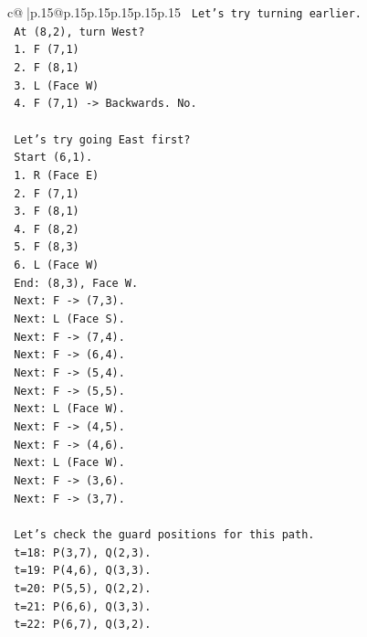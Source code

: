 \documentclass{article}
\begin{document}
{\begin{supertabular}{c@{$\;$}|p{.15\linewidth}@{}p{.15\linewidth}p{.15\linewidth}p{.15\linewidth}p{.15\linewidth}p{.15\linewidth}}
{{{\texttt{       Let's try turning earlier.} \\
\texttt{       At (8,2), turn West?} \\
\texttt{       1. F (7,1)} \\
\texttt{       2. F (8,1)} \\
\texttt{       3. L (Face W)} \\
\texttt{       4. F (7,1) {-}> Backwards. No.} \\
\\ 
\texttt{       Let's try going East first?} \\
\texttt{       Start (6,1).} \\
\texttt{       1. R (Face E)} \\
\texttt{       2. F (7,1)} \\
\texttt{       3. F (8,1)} \\
\texttt{       4. F (8,2)} \\
\texttt{       5. F (8,3)} \\
\texttt{       6. L (Face W)} \\
\texttt{       End: (8,3), Face W.} \\
\texttt{       Next: F {-}> (7,3).} \\
\texttt{       Next: L (Face S).} \\
\texttt{       Next: F {-}> (7,4).} \\
\texttt{       Next: F {-}> (6,4).} \\
\texttt{       Next: F {-}> (5,4).} \\
\texttt{       Next: F {-}> (5,5).} \\
\texttt{       Next: L (Face W).} \\
\texttt{       Next: F {-}> (4,5).} \\
\texttt{       Next: F {-}> (4,6).} \\
\texttt{       Next: L (Face W).} \\
\texttt{       Next: F {-}> (3,6).} \\
\texttt{       Next: F {-}> (3,7).} \\
\\ 
\texttt{       Let's check the guard positions for this path.} \\
\texttt{       t=18: P(3,7), Q(2,3).} \\
\texttt{       t=19: P(4,6), Q(3,3).} \\
\texttt{       t=20: P(5,5), Q(2,2).} \\
\texttt{       t=21: P(6,6), Q(3,3).} \\
\texttt{       t=22: P(6,7), Q(3,2).} \\
}}}
\end{supertabular}}
\end{document}
